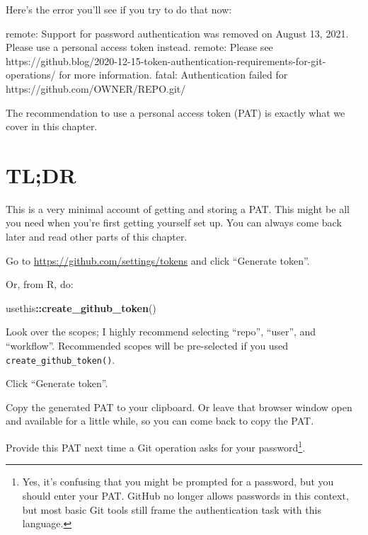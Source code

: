 \documentclass[
]{book}
\newenvironment{Shaded}{\begin{snugshade}}{\end{snugshade}}
\newcommand{\FunctionTok}[1]{\textcolor[rgb]{0.13,0.29,0.53}{\textbf{#1}}}
\newcommand{\NormalTok}[1]{#1}
\newcommand{\SpecialCharTok}[1]{\textcolor[rgb]{0.81,0.36,0.00}{\textbf{#1}}}
\begin{document}
Here's the error you'll see if you try to do that now:

\begin{Shaded}
\begin{Highlighting}[]
\NormalTok{remote: Support for password authentication was removed on August 13, 2021. Please use a personal access token instead.}
\NormalTok{remote: Please see https://github.blog/2020{-}12{-}15{-}token{-}authentication{-}requirements{-}for{-}git{-}operations/ for more information.}
\NormalTok{fatal: Authentication failed for \textquotesingle{}https://github.com/OWNER/REPO.git/\textquotesingle{}}
\end{Highlighting}
\end{Shaded}

The recommendation to use a personal access token (PAT) is exactly what we cover in this chapter.

\section{TL;DR}\label{tldr}

This is a very minimal account of getting and storing a PAT.
This might be all you need when you're first getting yourself set up.
You can always come back later and read other parts of this chapter.

Go to \url{https://github.com/settings/tokens} and click ``Generate token''.

Or, from R, do:

\begin{Shaded}
\begin{Highlighting}[]
\NormalTok{usethis}\SpecialCharTok{::}\FunctionTok{create\_github\_token}\NormalTok{()}
\end{Highlighting}
\end{Shaded}

Look over the scopes; I highly recommend selecting ``repo'', ``user'', and ``workflow''.
Recommended scopes will be pre-selected if you used \texttt{create\_github\_token()}.

Click ``Generate token''.

Copy the generated PAT to your clipboard.
Or leave that browser window open and available for a little while, so you can come back to copy the PAT.

Provide this PAT next time a Git operation asks for your password\footnote{Yes, it's confusing that you might be prompted for a password, but you should enter your PAT.
  GitHub no longer allows passwords in this context, but most basic Git tools still frame the authentication task with this language.}.
\end{document}
